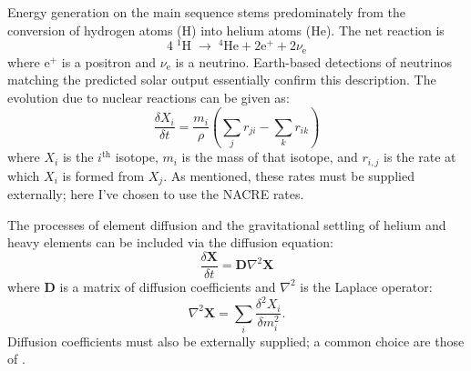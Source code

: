 \begin{description}
    \setlength{\itemindent}{0pt}
    \item[Nuclear reactions.] Energy generation on the main sequence stems predominately from the conversion of hydrogen atoms (H) into helium atoms (He). 
    The net reaction is 
    \begin{equation}
        4\;^1\text{H}\; \rightarrow\; ^4\text{He} + 2\text{e}^+ + 2\nu_{\text{e}}
    \end{equation}
    where e$^+$ is a positron and $\nu_{\text{e}}$ is a neutrino. 
    Earth-based detections of neutrinos matching the predicted solar output essentially confirm this description. 
    The evolution due to nuclear reactions can be given as: 
    \begin{equation} \boxed{
        \frac{\delta X_i}{\delta t}
        =
        \frac{m_i}{\rho}
        \left( 
            \sum_j r_{ji}
            -
            \sum_k r_{ik}
        \right)
    }\end{equation}
    where $X_i$ is the $i^{\text{th}}$ isotope, $m_i$ is the mass of that isotope, and $r_{i,j}$ is the rate at which $X_i$ is formed from $X_j$. 
    As mentioned, these rates must be supplied externally; here I've chosen to use the \textsc{NACRE} rates. 
    
    \item[Diffusion.] The processes of element diffusion and the gravitational settling of helium and heavy elements can be included via the diffusion equation: 
    \begin{equation} \label{eq:evol-diffusion} \boxed{
        \frac{\delta \mathbf{X}}{\delta t}
        =
        \mathbf{D} \nabla^2 \mathbf{X}
    }\end{equation}
    where $\mathbf{D}$ is a matrix of diffusion coefficients and $\nabla^2$ is the Laplace operator:
    \begin{equation}
        \nabla^2 \mathbf{X}
        =
        \sum_i
        \frac{\delta^2 X_i}{\delta m^2_i}.
    \end{equation}
    Diffusion coefficients must also be externally supplied; a common choice are those of \citealt{1994ApJ...421..828T}. 
    

\end{description}
